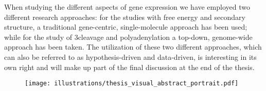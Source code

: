 When studying the different aspects of gene expression we have employed two
different research approaches: for the studies with free energy and secondary
structure, a traditional gene-centric, single-molecule approach has been used;
while for the study of 3\ppp cleavage and polyadenylation a top-down,
genome-wide approach has been taken. The utilization of these two different
approaches, which can also be referred to as hypothesis-driven and data-driven,
is interesting in its own right and will make up part of the final discussion
at the end of the thesis.

\begin{figure}[htb]
	\begin{center}
		\texttt{[image: illustrations/thesis\_visual\_abstract\_portrait.pdf]}
	\end{center}
	\caption{}
	\label{fig:thesis_visual}
\end{figure}
